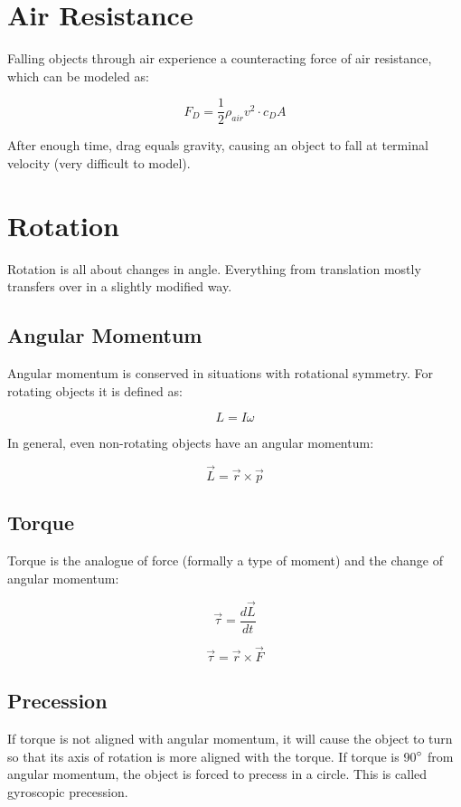 \documentclass{article}
\begin{document}
\section{Air Resistance}

Falling objects through air experience a counteracting force of air resistance, which can be modeled as:

$$F_D=\frac{1}{2}\rho_{air} v^2 \cdot c_D A$$

After enough time, drag equals gravity, causing an object to fall at terminal velocity (very difficult to model).

\section{Rotation}

Rotation is all about changes in angle. Everything from translation mostly transfers over in a slightly modified way. 

\subsection{Angular Momentum}

Angular momentum is conserved in situations with rotational symmetry. For rotating objects it is defined as:

$$L=I\omega$$

In general, even non-rotating objects have an angular momentum:

$$\vec{L}=\vec{r}\times \vec{p}$$

\subsection{Torque}

Torque is the analogue of force (formally a type of moment) and the change of angular momentum:

$$\vec{\tau}=\frac{d\vec{L}}{dt}$$

$$\vec{\tau}=\vec{r}\times\vec{F}$$

\subsection{Precession}

If torque is not aligned with angular momentum, it will cause the object to turn so that its axis of rotation is more aligned with the torque. If torque is 90$\degree$ from angular momentum, the object is forced to precess in a circle. This is called gyroscopic precession.
\end{document}
